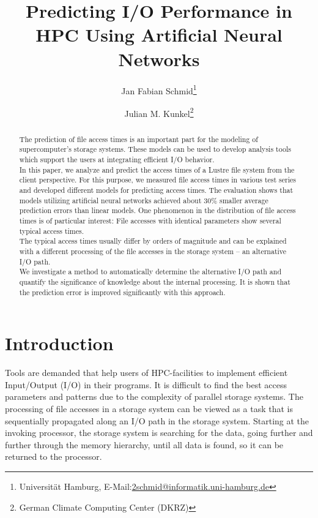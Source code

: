 \documentclass{superfri}
\begin{document}
	
	\author{Jan Fabian Schmid\footnote{\label{susu}Universität Hamburg, E-Mail:\url{2schmid@informatik.uni-hamburg.de}} \and Julian M. Kunkel\footnote{German Climate Computing Center (DKRZ)}}
	
	\title{Predicting I/O Performance in HPC Using Artificial Neural Networks}
	
	\maketitle{}
	
	\begin{abstract}
		
		The prediction of file access times is an important part for the modeling of supercomputer's storage systems. 
		These models can be used to develop analysis tools which support the users at integrating efficient I/O behavior.\\
		In this paper, we analyze and predict the access times of a Lustre file system from the client perspective.
		For this purpose, we measured file access times in various test series and developed different models for predicting access times. 
		The evaluation shows that models utilizing artificial neural networks achieved about 30\% smaller average prediction errors than linear models. 
		One phenomenon in the distribution of file access times is of particular interest:
		File accesses with identical parameters show several typical access times.\\
		The typical access times usually differ by orders of magnitude and can be explained with a different processing of the file accesses in the storage system -- an alternative I/O path.\\
		We investigate a method to automatically determine the alternative I/O path and quantify the significance of knowledge about the internal processing.
		It is shown that the prediction error is improved significantly with this approach.
		
	\end{abstract}
	
	\section*{Introduction}
	\label{sec:intro}
	
	Tools are demanded that help users of HPC-facilities to implement efficient Input/Output (I/O) in their programs.
	It is difficult to find the best access parameters and patterns due to the complexity of parallel storage systems.
	The processing of file accesses in a storage system can be viewed as a task that is sequentially propagated along an I/O path in the storage system.
	Starting at the invoking processor, the storage system is searching for the data, going further and further through the memory hierarchy, until all data is found, so it can be returned to the processor.
	
\end{document}
